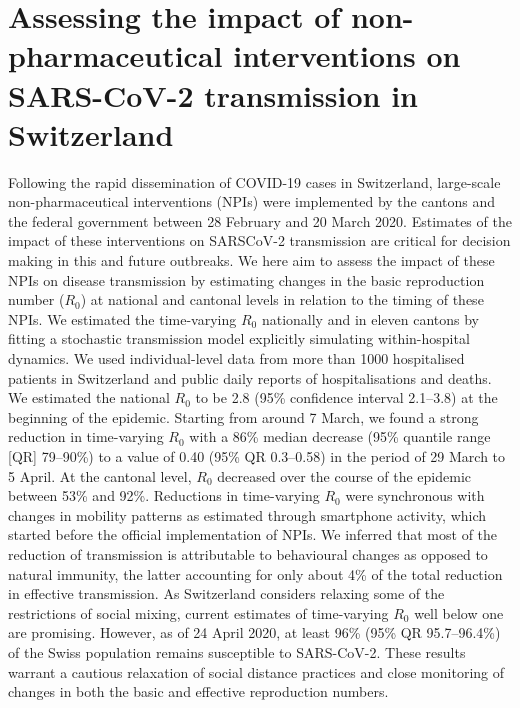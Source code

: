 \chapter{Assessing the impact of non-pharmaceutical interventions on SARS-CoV-2 transmission in Switzerland}
\label{ch:covid-switzerland-npi}

Following the rapid dissemination of COVID-19 cases in Switzerland, large-scale non-pharmaceutical interventions (NPIs) were implemented by the cantons and the federal government between 28 February and 20 March 2020. Estimates of the impact of these interventions on SARSCoV-2 transmission are critical for decision making in this and future outbreaks. We here aim to assess the impact of these NPIs on disease transmission by estimating changes in the basic reproduction number ($R_0$) at national and cantonal levels in relation to the timing of these NPIs. We estimated the time-varying $R_0$ nationally and in eleven cantons by fitting a stochastic transmission model explicitly simulating within-hospital dynamics. We used individual-level data from more than 1000 hospitalised patients in Switzerland and public daily reports of hospitalisations and deaths. We estimated the national $R_0$ to be 2.8 (95\% confidence interval 2.1–3.8) at the beginning of the epidemic. Starting from around 7 March, we found a strong reduction in time-varying $R_0$ with a 86\% median decrease (95\% quantile range [QR] 79–90\%) to a value of 0.40 (95\% QR 0.3–0.58) in the period of 29 March to 5 April. At the cantonal level, $R_0$ decreased over the course of the epidemic between 53\% and 92\%. Reductions in time-varying $R_0$ were synchronous with changes in mobility patterns as estimated through smartphone activity, which started before the official implementation of NPIs. We inferred that most of the reduction of transmission is attributable to behavioural changes as opposed to natural immunity, the latter accounting for only about 4\% of the total reduction in effective transmission. As Switzerland considers relaxing some of the restrictions of social mixing, current estimates of time-varying $R_0$ well below one are promising. However, as of 24 April 2020, at least 96\% (95\% QR 95.7–96.4\%) of the Swiss population remains susceptible to SARS-CoV-2. These results warrant a cautious relaxation of social distance practices and close monitoring of changes in both the basic and effective reproduction numbers.

